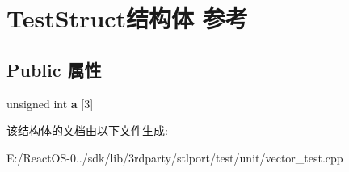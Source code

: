 \hypertarget{struct_test_struct}{}\section{Test\+Struct结构体 参考}
\label{struct_test_struct}
\subsection*{Public 属性}
\begin{DoxyCompactItemize}
\item 
\mbox{\label{struct_test_struct_a056aa534fe6ecf628331c4668679911e}} 
unsigned int {\bfseries a} \mbox{[}3\mbox{]}
\end{DoxyCompactItemize}


该结构体的文档由以下文件生成\+:\begin{DoxyCompactItemize}
\item 
E\+:/\+React\+O\+S-\/0../sdk/lib/3rdparty/stlport/test/unit/vector\+\_\+test.\+cpp\end{DoxyCompactItemize}
